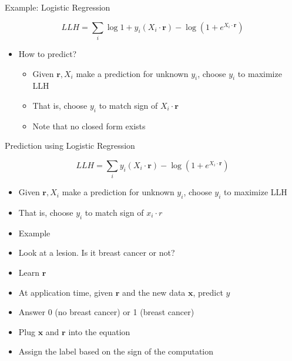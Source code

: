 \documentclass[aspectratio=169]{beamer}
\begin{document}
\begin{frame}{Example: Logistic Regression}

$$LLH = \sum_i \log 1 + y_i (X_i \cdot \boldsymbol{r}) - \log (1 + e^{X_i \cdot \boldsymbol{r}})$$
\begin{itemize}
\item How to predict?
\begin{itemize}
\item Given $\boldsymbol{r}, X_i$ make a prediction for unknown $y_i$, choose $y_i$ to maximize LLH
\item That is, choose $y_i$ to match sign of $X_i \cdot \boldsymbol{r}$
\item Note that no closed form exists
\end{itemize}
\end{itemize}
\end{frame}
\begin{frame}{Prediction using Logistic Regression}

$$LLH = \sum_i  y_i (X_i \cdot \boldsymbol{r}) - \log (1 + e^{X_i \cdot \boldsymbol{r}})$$
\begin{itemize}
	\item Given $\boldsymbol{r}, X_i$ make a prediction for unknown $y_i$, choose $y_i$ to maximize LLH
	\item That is, choose $y_i$ to match sign of $x_i \cdot r$
	\vspace{2em}
	\item Example
	\item Look at a lesion. Is it breast cancer or not?
	\item Learn $\boldsymbol{r}$
	\item At application time, given $\boldsymbol{r}$ and the new data $\boldsymbol{x}$, predict $\hat{y}$
	\item Answer 0 (no breast cancer) or 1 (breast cancer) 
	\item Plug $\boldsymbol{x}$ and $\boldsymbol{r}$ into the equation
	\item Assign the label based on the sign of the computation 
\end{itemize}
\end{frame}
%
\end{document}
